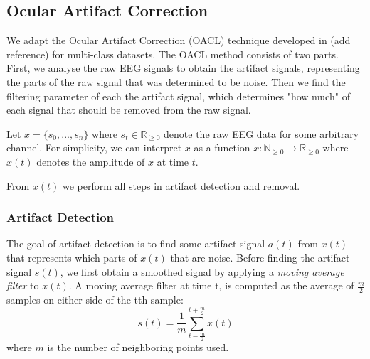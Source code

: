 \subsection{Ocular Artifact Correction}
We adapt the  Ocular Artifact Correction (OACL) technique developed in (add reference) for multi-class datasets. The OACL method consists of two parts. First, we analyse the raw EEG signals to obtain the artifact signals, representing the parts of the raw signal that was determined to be noise. Then we find the filtering parameter of each the artifact signal, which determines "how much" of each signal that should be removed from the raw signal. 

Let $x = \{s_0, ...,s_n\}$ where $s_t \in \mathbb{R}_{\geq 0}$ denote the raw EEG data for some arbitrary channel. For simplicity, we can interpret $x$ as a function $x : \mathbb{N}_{\geq 0} \rightarrow \mathbb{R}_{\geq 0}$ where $x(t)$ denotes the amplitude of $x$ at time $t$. 

From $x(t)$ we perform all steps in artifact detection and removal.


\subsubsection{Artifact Detection}
The goal of artifact detection is to find some artifact signal $a(t)$ from $x(t)$ that represents which parts of $x(t)$ that are noise. Before finding the artifact signal $s(t)$, we first obtain a smoothed signal by applying a \emph{moving average filter} to $x(t)$. A moving average filter at time t, is computed as the average of $\frac{m}{2}$ samples on either side of the tth sample:
\begin{equation}
\label{eq:movavg}
s(t) = \frac{1}{m}\sum_{t-\frac{m}{2}}^{t+\frac{m}{2}}x(t)
\end{equation}
where $m$ is the number of neighboring points used.

